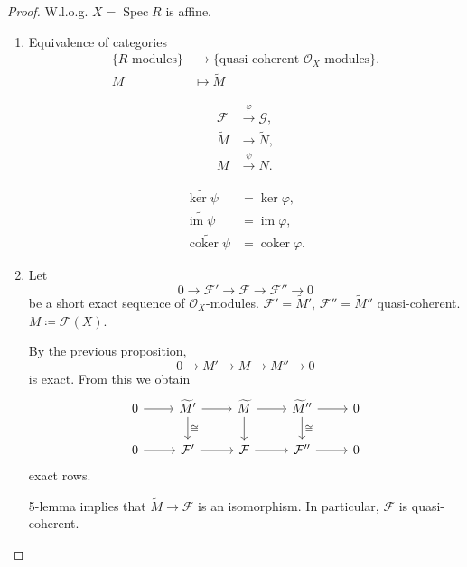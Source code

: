 \documentclass[12pt]{article}
\DeclareMathOperator{\im}{im}
\DeclareMathOperator{\coker}{coker}
\DeclareMathOperator{\Spec}{Spec}
\theoremstyle{definition}
\begin{document}
\begin{proof}
W.l.o.g. $X=\Spec R$ is affine.
\begin{enumerate}[label=\arabic*)]
\item Equivalence of categories
\begin{align*}
\{R\text{-modules}\}&\longrightarrow\{\text{quasi-coherent }\mathcal{O}_X\text{-modules}\}.\\
M&\longmapsto\widetilde{M}
\end{align*}

\begin{align*}
\mathcal{F}&\overset{\varphi}{\longrightarrow}\mathcal{G},\\
\widetilde{M}&\longrightarrow\widetilde{N},\\
M&\overset{\psi}{\longrightarrow}N.
\end{align*}

\begin{align*}
\widetilde{\ker\psi}&=\ker\varphi,\\
\widetilde{\im\psi}&=\im\varphi,\\
\widetilde{\coker\psi}&=\coker\varphi.
\end{align*}

\item Let
\[0\longrightarrow\mathcal{F}'\longrightarrow\mathcal{F}\longrightarrow\mathcal{F}''\longrightarrow0\]
be a short exact sequence of $\mathcal{O}_X$-modules. $\mathcal{F}'=\widetilde{M}'$, $\mathcal{F}''=\widetilde{M}''$ quasi-coherent. $M\coloneqq\mathcal{F}(X)$.

By the previous proposition,
\[0\longrightarrow M'\longrightarrow M\longrightarrow M''\longrightarrow0\]
is exact. From this we obtain
\[
\begin{tikzcd}
0\arrow[r]&\widetilde{M}'\arrow[r]\arrow[d,"\cong"]&\widetilde{M}\arrow[r]\arrow[d]&\widetilde{M}''\arrow[r]\arrow[d,"\cong"]&0\\
0\arrow[r]&\mathcal{F}'\arrow[r]&\mathcal{F}\arrow[r]&\mathcal{F}''\arrow[r]&0
\end{tikzcd}
\]
exact rows.

5-lemma implies that $\widetilde{M}\rightarrow\mathcal{F}$ is an isomorphism. In particular, $\mathcal{F}$ is quasi-coherent.
\end{enumerate}
\end{proof}
\end{document}
